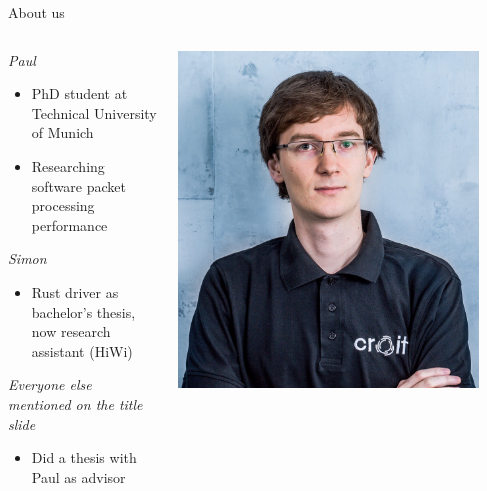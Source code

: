\documentclass[NET,english,aspectratio=169,notitleframe]{tumbeamer}
\begin{document}
\begin{frame}{About us}
\begin{columns}
\begin{column}{0.8\textwidth}
\emph{Paul}
\begin{itemize}
\item PhD student at Technical University of Munich
\item Researching software packet processing performance
\end{itemize}
\vspace{1em}
\emph{Simon}
\begin{itemize}
\item Rust driver as bachelor's thesis, now research assistant (HiWi)
\end{itemize}
\vspace{1em}
\emph{Everyone else mentioned on the title slide}
\begin{itemize}
\item Did a thesis with Paul as advisor
\end{itemize}
\end{column}
\begin{column}{0.2\textwidth}
\includegraphics[width=0.9\textwidth]{pics/paul.jpg}\\

\end{column}
\end{columns}
\end{frame}
\end{document}
